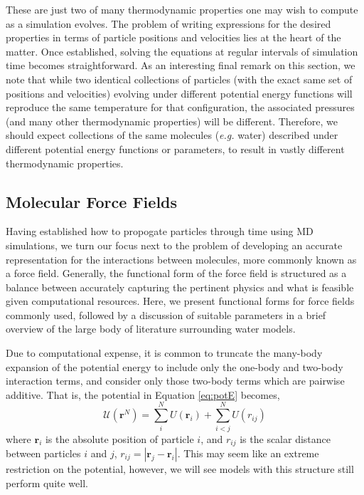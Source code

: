 These are just two of many thermodynamic properties one may wish to
compute as a simulation evolves. The problem of writing expressions
for the desired properties in terms of particle positions and
velocities lies at the heart of the matter. Once established, solving
the equations at regular intervals of simulation time becomes
straightforward. As an interesting final remark on this section, we
note that while two identical collections of particles (with the exact
same set of positions and velocities) evolving under different
potential energy functions will reproduce the same temperature for
that configuration, the associated pressures (and many other
thermodynamic properties) will be different. Therefore, we should
expect collections of the same molecules (\textit{e.g.} water)
described under different potential energy functions or parameters, to
result in vastly different thermodynamic properties.

\subsection{Molecular Force Fields}
Having established how to propogate particles through time using MD
simulations, we turn our focus next to the problem of developing an
accurate representation for the interactions between molecules, more
commonly known as a force field. Generally, the functional form of the
force field is structured as a balance between accurately capturing
the pertinent physics and what is feasible given computational
resources. Here, we present functional forms for force fields commonly
used, followed by a discussion of suitable parameters in a brief
overview of the large body of literature surrounding water models.

Due to computational expense, it is common to truncate the many-body
expansion of the potential energy to include only the one-body and
two-body interaction terms, and consider only those two-body terms
which are pairwise additive. That is, the potential in Equation
\eqref{eq:potE} becomes,
\begin{equation}\label{eq:potPair}
\mathscr{U}(\mathbf{r}^N) = \sum_i^N U(\mathbf{r}_i) + \sum_{i<j}^N U(r_{ij})
\end{equation}
where $\mathbf{r}_i$ is the absolute position of particle $i$, and
$r_{ij}$ is the scalar distance between particles $i$ and $j$,
$r_{ij} = | \mathbf{r}_j - \mathbf{r}_i|$. This may seem like an
extreme restriction on the potential, however, we will see models with
this structure still perform quite well.

